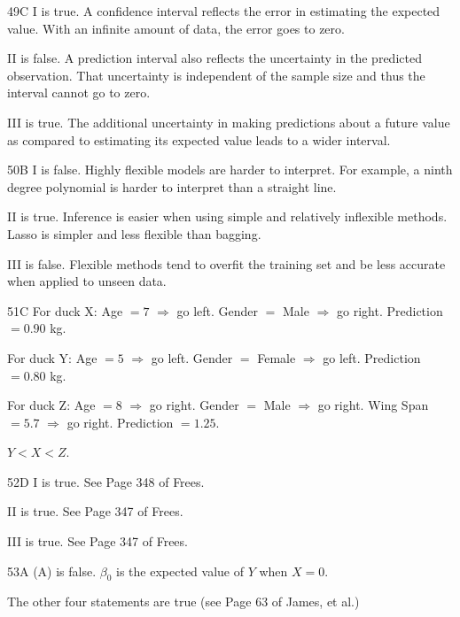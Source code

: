 \begin{solution}{49}{C}
I is true. A confidence interval reflects the error in estimating the expected value. With an infinite amount of data, the error goes to zero.

II is false. A prediction interval also reflects the uncertainty in the predicted observation. That uncertainty is independent of the sample size and thus the interval cannot go to zero.

III is true. The additional uncertainty in making predictions about a future value as compared to estimating its expected value leads to a wider interval.
\end{solution}

\begin{solution}{50}{B}
I is false. Highly flexible models are harder to interpret. For example, a ninth degree polynomial is harder to interpret than a straight line.

II is true. Inference is easier when using simple and relatively inflexible methods. Lasso is simpler and less flexible than bagging.

III is false. Flexible methods tend to overfit the training set and be less accurate when applied to unseen data.
\end{solution}

\begin{solution}{51}{C}
For duck X: Age $= 7$ $\Rightarrow$ go left. Gender $=$ Male $\Rightarrow$ go right. Prediction $= 0.90$ kg.

For duck Y: Age $= 5$ $\Rightarrow$ go left. Gender $=$ Female $\Rightarrow$ go left. Prediction $= 0.80$ kg.

For duck Z: Age $= 8$ $\Rightarrow$ go right. Gender $=$ Male $\Rightarrow$ go right. Wing Span $= 5.7$ $\Rightarrow$ go right. Prediction $= 1.25$.

$Y < X < Z$.
\end{solution}

\begin{solution}{52}{D}
I is true. See Page 348 of Frees.

II is true. See Page 347 of Frees.

III is true. See Page 347 of Frees.
\end{solution}

\begin{solution}{53}{A}
(A) is false. $\beta_0$ is the expected value of $Y$ when $X = 0$.

The other four statements are true (see Page 63 of James, et al.)
\end{solution}

